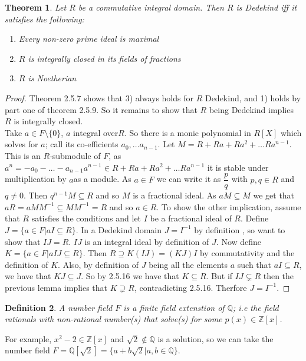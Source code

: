 \documentclass[a4paper,10pt]{article}
\newtheorem{thm}{Theorem}[subsection]
\newtheorem{defn}[thm]{Definition}
\begin{document}
\begin{thm}
Let $R$ be a commutative integral domain. Then $R$ is Dedekind iff it satisfies the following:
\begin{enumerate}
 \item Every non-zero prime ideal is maximal
 \item $R$ is integrally closed in its fields of fractions
 \item $R$ is Noetherian
\end{enumerate}
\end{thm}
\begin{proof}
Theorem 2.5.7 shows that 3) always holds for $R$ Dedekind, and 1) holds by part one of theorem 2.5.9. So it remains to show that $R$ being Dedekind implies $R$ is integrally closed.
\\ Take $a\in F\setminus \{0\}$, $a$ integral over$R$. So there is a monic polynomial in $R[X]$ which solves for $a$; call its co-efficients $a_{0},\ldots a_{n-1}$. Let $M=R+Ra+Ra^{2}+\ldots Ra^{n-1}$. This is an $R$-submodule of $F$, as $a^{n}=-a_{0}-\ldots -a_{n-1}a^{n-1}\in R+Ra+Ra^{2}+\ldots Ra^{n-1}$ it is stable under multiplication by $a$as a module. As $a\in F$ we can write it as $\dfrac{p}{q}$ with $p,q\in R$ and $q\neq 0$. Then $q^{n-1}M\subseteq R$ and so $M$ is a fractional ideal. As $aM\subseteq M$ we get that $aR=aMM^{-1}\subseteq MM^{-1}=R$ and so $a\in R$.
\newline To show the other implication, assume that $R$ satisfies the conditions and let $I$ be a fractional ideal of $R$. Define $J=\{a\in F|aI\subseteq R\}$. In a Dedekind domain $J=I^{-1}$ by definition , so want to show that $IJ=R$. $IJ$ is an integral ideal by definition of $J$. Now define $K=\{a\in F|aIJ\subseteq R\}$. Then $R\supseteq K(IJ)=(KJ)I$ by commutativity and the definition of $K$. Also, by definition of $J$ being all the elements $a$ such that $aI\subseteq R$, we have that $KJ\subseteq J$. So by 2.5.16 we have that $K\subseteq R$. But if $IJ\subsetneq R$ then the previous lemma implies that $K\supsetneq R$, contradicting 2.5.16. Therfore $J=I^{-1}$.
\end{proof}

\begin{defn}
A number field $F$ is a finite field extenstion of $\mathbb{Q}$; i.e the field rationals with non-rational number(s) that solve(s) for some $p(x)\in \mathbb{Z}[x]$.
\end{defn}
 For example, $x^{2}-2\in \mathbb{Z}[x]$ and $\sqrt{2}\notin \mathbb{Q}$ is a solution, so we can take the number field $F=\mathbb{Q}[\sqrt{2}]=\{a+b\sqrt{2}|a,b\in \mathbb{Q}\}$.
\end{document}
